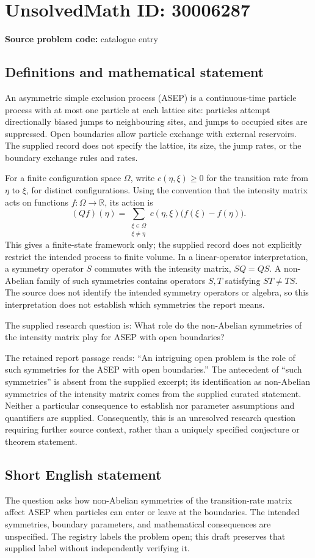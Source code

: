 \documentclass[11pt]{article}
\newcommand{\R}{\mathbb{R}}
\begin{document}
\section*{UnsolvedMath ID: 30006287}
\textbf{Source problem code:} catalogue entry
\subsection{Definitions and mathematical statement}
An asymmetric simple exclusion process (ASEP) is a continuous-time particle process with at most one particle at each lattice site: particles attempt directionally biased jumps to neighbouring sites, and jumps to occupied sites are suppressed. Open boundaries allow particle exchange with external reservoirs. The supplied record does not specify the lattice, its size, the jump rates, or the boundary exchange rules and rates.

For a finite configuration space \(\Omega\), write \(c(\eta,\xi)\geq 0\) for the transition rate from \(\eta\) to \(\xi\), for distinct configurations. Using the convention that the intensity matrix acts on functions \(f:\Omega\to\R\), its action is
\[
(Qf)(\eta)=\sum_{\substack{\xi\in\Omega\\\xi\ne\eta}}c(\eta,\xi)\bigl(f(\xi)-f(\eta)\bigr).
\]
This gives a finite-state framework only; the supplied record does not explicitly restrict the intended process to finite volume. In a linear-operator interpretation, a symmetry operator \(S\) commutes with the intensity matrix, \(SQ=QS\). A non-Abelian family of such symmetries contains operators \(S,T\) satisfying \(ST\ne TS\). The source does not identify the intended symmetry operators or algebra, so this interpretation does not establish which symmetries the report means.

The supplied research question is: What role do the non-Abelian symmetries of the intensity matrix play for ASEP with open boundaries?

The retained report passage reads: ``An intriguing open problem is the role of such symmetries for the ASEP with open boundaries.'' The antecedent of ``such symmetries'' is absent from the supplied excerpt; its identification as non-Abelian symmetries of the intensity matrix comes from the supplied curated statement. Neither a particular consequence to establish nor parameter assumptions and quantifiers are supplied. Consequently, this is an unresolved research question requiring further source context, rather than a uniquely specified conjecture or theorem statement.
\subsection{Short English statement}
The question asks how non-Abelian symmetries of the transition-rate matrix affect ASEP when particles can enter or leave at the boundaries. The intended symmetries, boundary parameters, and mathematical consequences are unspecified. The registry labels the problem open; this draft preserves that supplied label without independently verifying it.
\end{document}

